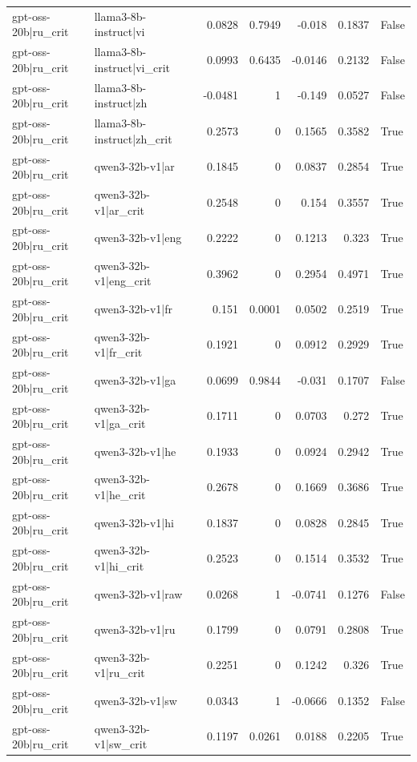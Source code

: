 \begin{table}
\begin{tabular}{l l r r r r l}
gpt-oss-20b|ru_crit & llama3-8b-instruct|vi & 0.0828 & 0.7949 & -0.018 & 0.1837 & False \\
gpt-oss-20b|ru_crit & llama3-8b-instruct|vi_crit & 0.0993 & 0.6435 & -0.0146 & 0.2132 & False \\
gpt-oss-20b|ru_crit & llama3-8b-instruct|zh & -0.0481 & 1 & -0.149 & 0.0527 & False \\
gpt-oss-20b|ru_crit & llama3-8b-instruct|zh_crit & 0.2573 & 0 & 0.1565 & 0.3582 & True \\
gpt-oss-20b|ru_crit & qwen3-32b-v1|ar & 0.1845 & 0 & 0.0837 & 0.2854 & True \\
gpt-oss-20b|ru_crit & qwen3-32b-v1|ar_crit & 0.2548 & 0 & 0.154 & 0.3557 & True \\
gpt-oss-20b|ru_crit & qwen3-32b-v1|eng & 0.2222 & 0 & 0.1213 & 0.323 & True \\
gpt-oss-20b|ru_crit & qwen3-32b-v1|eng_crit & 0.3962 & 0 & 0.2954 & 0.4971 & True \\
gpt-oss-20b|ru_crit & qwen3-32b-v1|fr & 0.151 & 0.0001 & 0.0502 & 0.2519 & True \\
gpt-oss-20b|ru_crit & qwen3-32b-v1|fr_crit & 0.1921 & 0 & 0.0912 & 0.2929 & True \\
gpt-oss-20b|ru_crit & qwen3-32b-v1|ga & 0.0699 & 0.9844 & -0.031 & 0.1707 & False \\
gpt-oss-20b|ru_crit & qwen3-32b-v1|ga_crit & 0.1711 & 0 & 0.0703 & 0.272 & True \\
gpt-oss-20b|ru_crit & qwen3-32b-v1|he & 0.1933 & 0 & 0.0924 & 0.2942 & True \\
gpt-oss-20b|ru_crit & qwen3-32b-v1|he_crit & 0.2678 & 0 & 0.1669 & 0.3686 & True \\
gpt-oss-20b|ru_crit & qwen3-32b-v1|hi & 0.1837 & 0 & 0.0828 & 0.2845 & True \\
gpt-oss-20b|ru_crit & qwen3-32b-v1|hi_crit & 0.2523 & 0 & 0.1514 & 0.3532 & True \\
gpt-oss-20b|ru_crit & qwen3-32b-v1|raw & 0.0268 & 1 & -0.0741 & 0.1276 & False \\
gpt-oss-20b|ru_crit & qwen3-32b-v1|ru & 0.1799 & 0 & 0.0791 & 0.2808 & True \\
gpt-oss-20b|ru_crit & qwen3-32b-v1|ru_crit & 0.2251 & 0 & 0.1242 & 0.326 & True \\
gpt-oss-20b|ru_crit & qwen3-32b-v1|sw & 0.0343 & 1 & -0.0666 & 0.1352 & False \\
gpt-oss-20b|ru_crit & qwen3-32b-v1|sw_crit & 0.1197 & 0.0261 & 0.0188 & 0.2205 & True \\

\end{tabular}
\end{table}
